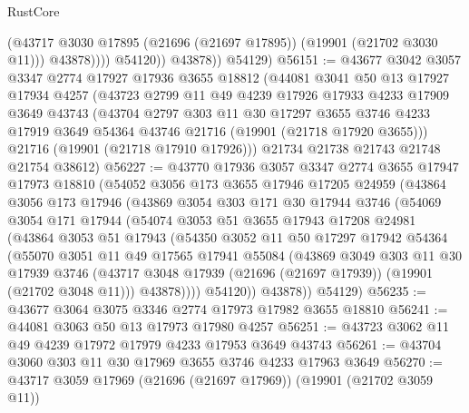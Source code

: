 \begin{lexlean}{RustCore}
\begin{coremodule}
                      (@43717 @3030 @17895 (@21696 (@21697 @17895)) (@19901 (@21702 @3030 @11)))
                      @43878))))
              @54120))
          @43878))
      @54129)
@56151 := @43677
    @3042
    @3057
    @3347
    @2774
    @17927
    @17936
    @3655
    @18812
    (@44081
      @3041
      @50
      @13
      @17927
      @17934
      @4257
      (@43723
        @2799
        @11
        @49
        @4239
        @17926
        @17933
        @4233
        @17909
        @3649
        @43743
        (@43704
          @2797
          @303
          @11
          @30
          @17297
          @3655
          @3746
          @4233
          @17919
          @3649
          @54364
          @43746
          @21716
          (@19901 (@21718 @17920 @3655)))
        @21716
        (@19901 (@21718 @17910 @17926)))
      @21734
      @21738
      @21743
      @21748
      @21754
      @38612)
@56227 := @43770
    @17936
    @3057
    @3347
    @2774
    @3655
    @17947
    @17973
    @18810
    (@54052
      @3056
      @173
      @3655
      @17946
      @17205
      @24959
      (@43864
        @3056
        @173
        @17946
        (@43869
          @3054
          @303
          @171
          @30
          @17944
          @3746
          (@54069
            @3054
            @171
            @17944
            (@54074
              @3053
              @51
              @3655
              @17943
              @17208
              @24981
              (@43864
                @3053
                @51
                @17943
                (@54350
                  @3052
                  @11
                  @50
                  @17297
                  @17942
                  @54364
                  (@55070
                    @3051
                    @11
                    @49
                    @17565
                    @17941
                    @55084
                    (@43869
                      @3049
                      @303
                      @11
                      @30
                      @17939
                      @3746
                      (@43717 @3048 @17939 (@21696 (@21697 @17939)) (@19901 (@21702 @3048 @11)))
                      @43878))))
              @54120))
          @43878))
      @54129)
@56235 := @43677 @3064 @3075 @3346 @2774 @17973 @17982 @3655 @18810
@56241 := @44081 @3063 @50 @13 @17973 @17980 @4257
@56251 := @43723 @3062 @11 @49 @4239 @17972 @17979 @4233 @17953 @3649 @43743
@56261 := @43704 @3060 @303 @11 @30 @17969 @3655 @3746 @4233 @17963 @3649
@56270 := @43717 @3059 @17969 (@21696 (@21697 @17969)) (@19901 (@21702 @3059 @11))

\end{coremodule}
\end{lexlean}
